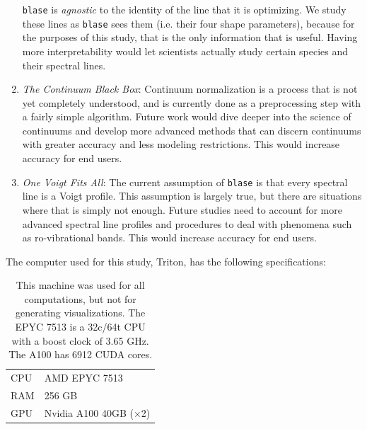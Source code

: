 \documentclass[twocolumn, linenumbers]{aastex631}
\begin{document}
\begin{enumerate}[label=-]
    \texttt{blase} is \textit{agnostic} to the identity of the line that it is optimizing. 
    We study these lines as \texttt{blase} sees them (i.e. their four shape parameters), because for the purposes of this study, that is the only information that is useful.
    Having more interpretability would let scientists actually study certain species and their spectral lines.
    \item \textit{The Continuum Black Box}: Continuum normalization is a process that is not yet completely understood, and is currently done as a preprocessing step with a fairly simple algorithm. 
    Future work would dive deeper into the science of continuums and develop more advanced methods that can discern continuums with greater accuracy and less modeling restrictions.
    This would increase accuracy for end users.
    \item \textit{One Voigt Fits All}: The current assumption of \texttt{blase} is that every spectral line is a Voigt profile. 
    This assumption is largely true, but there are situations where that is simply not enough. 
    Future studies need to account for more advanced spectral line profiles and procedures to deal with phenomena such as ro-vibrational bands.
    This would increase accuracy for end users.
\end{enumerate}
The computer used for this study, Triton, has the following specifications:
\begin{table}[h!]
    \centering
    \begin{tabular}{ll}
        \hline
        CPU & AMD EPYC 7513\\
        RAM & 256 GB\\
        GPU & Nvidia A100 40GB ($\times$2)\\
        \hline
    \end{tabular}
    \caption{This machine was used for all computations, but not for generating visualizations. The EPYC 7513 is a 32c/64t CPU with a boost clock of 3.65 GHz. The A100 has 6912 CUDA cores.}
\end{table}
\end{document}
